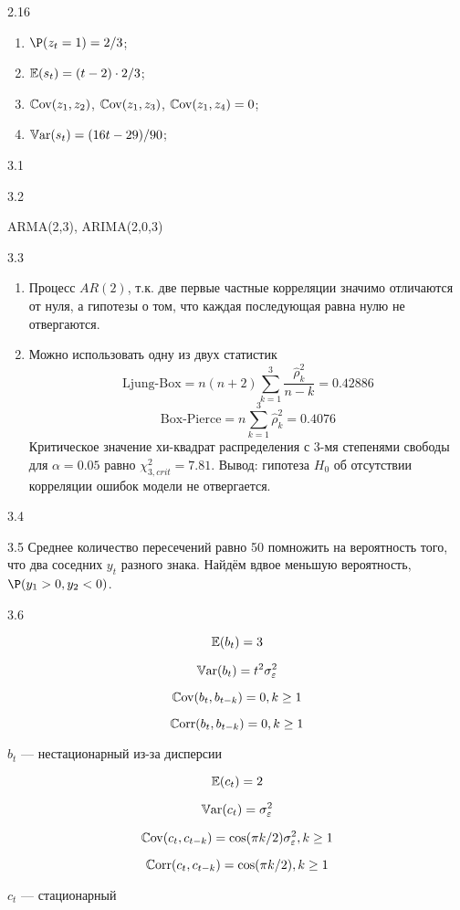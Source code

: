 \protect \hypertarget {soln:2.16}{}
\begin{solution}{{2.16}}
  \begin{enumerate}
  \item $\P(z_t = 1) = 2/3$;
  \item $\operatorname{\mathbb{E}}(s_t) = (t-2) \cdot 2/3$;
  \item $\operatorname{\mathbb{C}\mathrm{ov}}(z_1, z_2)$, $\operatorname{\mathbb{C}\mathrm{ov}}(z_1, z_3)$, $\operatorname{\mathbb{C}\mathrm{ov}}(z_1, z_4) = 0$;
  \item $\operatorname{\mathbb{V}\mathrm{ar}}(s_t) = (16t - 29)/90$;
  \end{enumerate}

\end{solution}
\protect \hypertarget {soln:3.1}{}
\begin{solution}{{3.1}}

\end{solution}
\protect \hypertarget {soln:3.2}{}
\begin{solution}{{3.2}}

ARMA(2,3), ARIMA(2,0,3)
\end{solution}
\protect \hypertarget {soln:3.3}{}
\begin{solution}{{3.3}}
\begin{enumerate}
\item Процесс $AR(2)$, т.к. две первые частные корреляции значимо отличаются от нуля, а гипотезы о том, что каждая последующая равна нулю не отвергаются.
\item Можно использовать одну из двух статистик
\[
\text{Ljung-Box}=n(n+2)\sum_{k=1}^3\frac{\hat{\rho}_k^2}{n-k}=
0.42886
\]
\[
\text{Box-Pierce}=n\sum_{k=1}^3\hat{\rho}_k^2=
0.4076
\]
Критическое значение хи-квадрат распределения с 3-мя степенями свободы для $\alpha=0.05$ равно $\chi^2_{3,crit}=7.81$.
Вывод: гипотеза $H_0$ об отсутствии корреляции ошибок модели не отвергается.
\end{enumerate}
\end{solution}
\protect \hypertarget {soln:3.4}{}
\begin{solution}{{3.4}}

\end{solution}
\protect \hypertarget {soln:3.5}{}
\begin{solution}{{3.5}}
Среднее количество пересечений равно 50 помножить на вероятность того, что два соседних $y_t$ разного знака. Найдём вдвое меньшую вероятность, $\P(y_1>0, y_2 <0)$.
\end{solution}
\protect \hypertarget {soln:3.6}{}
\begin{solution}{{3.6}}

\[
\operatorname{\mathbb{E}}(b_t) = 3
\]

\[
\operatorname{\mathbb{V}\mathrm{ar}}(b_t) = t^2 \sigma^2_{\varepsilon}
\]

\[
\operatorname{\mathbb{C}\mathrm{ov}}(b_t, b_{t-k}) = 0, k \geq 1
\]

\[
\operatorname{\mathbb{C}\mathrm{orr}}(b_t, b_{t-k}) = 0, k \geq 1
\]

$b_t$ — нестационарный из-за дисперсии


\[
\operatorname{\mathbb{E}}(c_t) = 2
\]

\[
\operatorname{\mathbb{V}\mathrm{ar}}(c_t) = \sigma^2_{\varepsilon}
\]

\[
\operatorname{\mathbb{C}\mathrm{ov}}(c_t, c_{t-k}) = \cos( \pi k /2)\sigma^2_{\varepsilon}, k \geq 1
\]

\[
\operatorname{\mathbb{C}\mathrm{orr}}(c_t, c_{t-k}) = \cos( \pi k /2), k \geq 1
\]

$c_t$ — стационарный
\end{solution}
